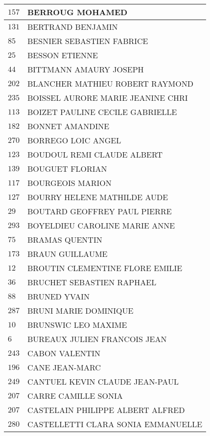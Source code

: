 \begin{xltabular}{\linewidth}{|l|X|}
    \hline
    $157$ & BERROUG MOHAMED \\
    \hline
    $131$ & BERTRAND BENJAMIN \\
    \hline
    $85$ & BESNIER SEBASTIEN FABRICE \\
    \hline
    $25$ & BESSON ETIENNE \\
    \hline
    $44$ & BITTMANN AMAURY JOSEPH \\
    \hline
    $202$ & BLANCHER MATHIEU ROBERT RAYMOND \\
    \hline
    $235$ & BOISSEL AURORE MARIE JEANINE CHRI \\
    \hline
    $113$ & BOIZET PAULINE CECILE GABRIELLE \\
    \hline
    $182$ & BONNET AMANDINE \\
    \hline
    $270$ & BORREGO LOIC ANGEL \\
    \hline
    $123$ & BOUDOUL REMI CLAUDE ALBERT \\
    \hline
    $139$ & BOUGUET FLORIAN \\
    \hline
    $117$ & BOURGEOIS MARION \\
    \hline
    $127$ & BOURRY HELENE MATHILDE AUDE \\
    \hline
    $29$ & BOUTARD GEOFFREY PAUL PIERRE \\
    \hline
    $293$ & BOYELDIEU CAROLINE MARIE ANNE \\
    \hline
    $75$ & BRAMAS QUENTIN \\
    \hline
    $173$ & BRAUN GUILLAUME \\
    \hline
    $12$ & BROUTIN CLEMENTINE FLORE EMILIE \\
    \hline
    $36$ & BRUCHET SEBASTIEN RAPHAEL \\
    \hline
    $88$ & BRUNED YVAIN \\
    \hline
    $287$ & BRUNI MARIE DOMINIQUE \\
    \hline
    $10$ & BRUNSWIC LEO MAXIME \\
    \hline
    $6$ & BUREAUX JULIEN FRANCOIS JEAN \\
    \hline
    $243$ & CABON VALENTIN \\
    \hline
    $196$ & CANE JEAN-MARC \\
    \hline
    $249$ & CANTUEL KEVIN CLAUDE JEAN-PAUL \\
    \hline
    $207$ & CARRE CAMILLE SONIA \\
    \hline
    $207$ & CASTELAIN PHILIPPE ALBERT ALFRED \\
    \hline
    $280$ & CASTELLETTI CLARA SONIA EMMANUELLE \\

\end{xltabular}
